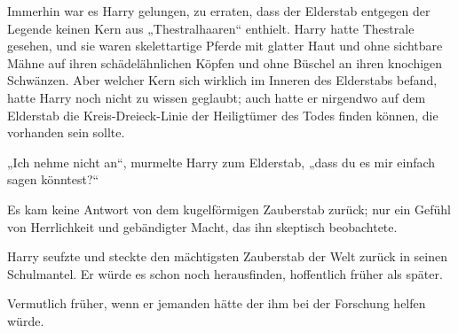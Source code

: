 Immerhin war es Harry gelungen, zu erraten, dass der Elderstab entgegen der Legende keinen Kern aus „Thestralhaaren“ enthielt. Harry hatte Thestrale gesehen, und sie waren skelettartige Pferde mit glatter Haut und ohne sichtbare Mähne auf ihren schädelähnlichen Köpfen und ohne Büschel an ihren knochigen Schwänzen. Aber welcher Kern sich wirklich im Inneren des Elderstabs befand, hatte Harry noch nicht zu wissen geglaubt; auch hatte er nirgendwo auf dem Elderstab die Kreis-Dreieck-Linie der Heiligtümer des Todes finden können, die vorhanden sein sollte.

„Ich nehme nicht an“, murmelte Harry zum Elderstab, „dass du es mir einfach sagen könntest?“

Es kam keine Antwort von dem kugelförmigen Zauberstab zurück; nur ein Gefühl von Herrlichkeit und gebändigter Macht, das ihn skeptisch beobachtete.

Harry seufzte und steckte den mächtigsten Zauberstab der Welt zurück in seinen Schulmantel. Er würde es schon noch herausfinden, hoffentlich früher als später.

Vermutlich früher, wenn er jemanden hätte der ihm bei der Forschung helfen würde.

